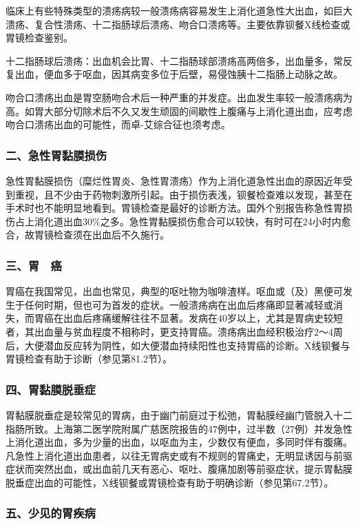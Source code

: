临床上有些特殊类型的溃疡病较一般溃疡病容易发生上消化道急性大出血，如巨大溃疡、复合性溃疡、十二指肠球后溃疡、吻合口溃疡等。主要依靠钡餐X线检查或胃镜检查鉴别。

十二指肠球后溃疡：出血机会比胃、十二指肠球部溃疡高两倍多，出血量多，常反复出血，便血多于呕血，因其病变多位于后壁，易侵蚀胰十二指肠上动脉之故。

吻合口溃疡出血是胃空肠吻合术后一种严重的并发症。出血发生率较一般溃疡病为高。如胃大部分切除术后不久又发生顽固的间歇性上腹痛与上消化道出血，应考虑吻合口溃疡出血的可能性，而卓-艾综合征也须考虑。

\subsubsection{二、急性胃黏膜损伤}

急性胃黏膜损伤（糜烂性胃炎、急性胃溃疡）作为上消化道急性出血的原因近年受到重视，且不少由于药物刺激所引起。由于损伤表浅，钡餐检查难以发现，甚至在手术时也不能明显地看到。胃镜检查是最好的诊断方法。国外个别报告称急性胃损伤占上消化道出血30\%之多。急性胃黏膜损伤愈合可以较快，有时可在24小时内愈合，故胃镜检查须在出血后不久施行。

\subsubsection{三、胃　癌}

胃癌在我国常见，出血也常见，典型的呕吐物为咖啡渣样。呕血或（及）黑便可发生于任何时期，但也可为首发的症状。一般溃疡病在出血后疼痛即显著减轻或消失，而胃癌在出血后疼痛缓解往往不显著。发病在40岁以上，尤其是胃病史较短者，其出血量与贫血程度不相称时，更支持胃癌。溃疡病出血经积极治疗2～4周后，大便潜血反应转为阴性，如大便潜血持续阳性也支持胃癌的诊断。X线钡餐与胃镜检查有助于诊断（参见第81.2节）。

\subsubsection{四、胃黏膜脱垂症}

胃黏膜脱垂症是较常见的胃病，由于幽门前庭过于松弛，胃黏膜经幽门管脱入十二指肠所致。上海第二医学院附属广慈医院报告的47例中，过半数（27例）并发急性上消化道出血，多为少量的出血，以呕血为主，少数仅有便血，多同时伴有腹痛。凡急性上消化道出血患者，以往无胃病史或有不规则的胃痛史，无明显诱因与前驱症状而突然出血，或出血前几天有恶心、呕吐、腹痛加剧等前驱症状，提示胃黏膜脱垂症出血的可能性，X线钡餐或胃镜检查有助于明确诊断（参见第67.2节）。

\subsubsection{五、少见的胃疾病}


